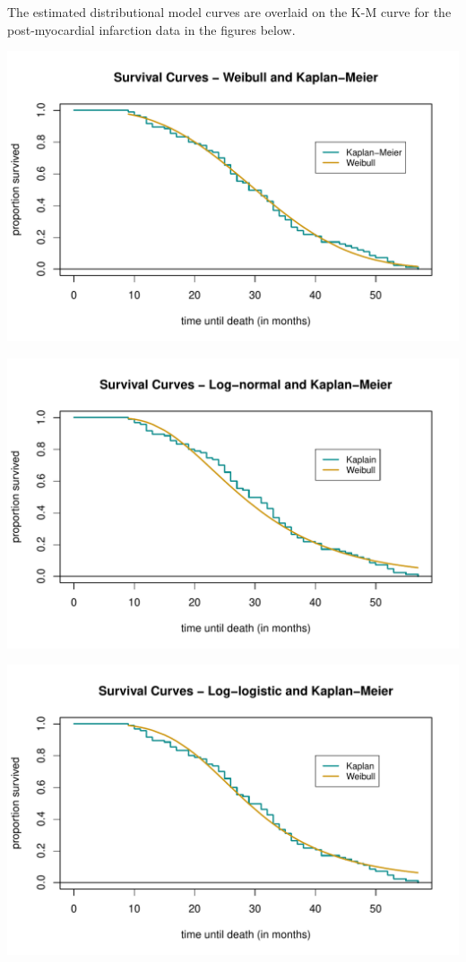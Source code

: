 \documentclass[
]{article}
\begin{document}
The estimated distributional model curves are overlaid on the K-M curve
for the post-myocardial infarction data in the figures below.

\begin{center}\includegraphics[width=0.75\linewidth]{markdown_files/figure-latex/unnamed-chunk-1-1} \end{center}

\begin{center}\includegraphics[width=0.75\linewidth]{markdown_files/figure-latex/unnamed-chunk-1-2} \end{center}

\begin{center}\includegraphics[width=0.75\linewidth]{markdown_files/figure-latex/unnamed-chunk-1-3} \end{center}
\end{document}

